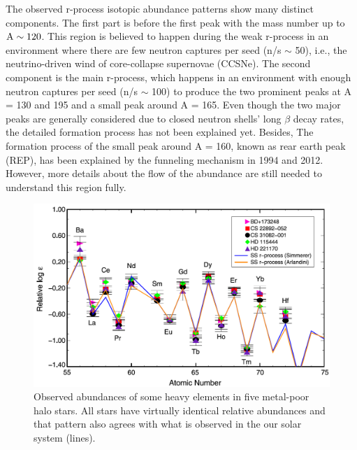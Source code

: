 \documentclass[aps,prl,preprint,groupedaddress]{revtex4}
\begin{document}
The observed r-process isotopic abundance patterns show many distinct components. The first part is before the first peak with the mass number up to $\rm{A \sim 120}$. This region is believed to happen during the weak r-process in an environment where there are few neutron captures per seed (n/s $\sim$ 50)\cite{1996}, i.e., the neutrino-driven wind of core-collapse supernovae (CCSNe)\cite{1994ApJ...433..229W}. The second component is the main r-process, which happens in an environment with enough neutron captures per seed (n/s $\sim$ 100) to produce the two prominent peaks at A = 130 and 195 and a small peak around A = 165. Even though the two major peaks are generally considered due to closed neutron shells' long $\beta$ decay rates, the detailed formation process has not been explained yet. Besides, The formation process of the small peak around A = 160, known as rear earth peak (REP), has been explained by the funneling mechanism in 1994\cite{1997astro.ph..1007S} and 2012\cite{PhysRevC.85.045801}. However, more details about the flow of the abundance are still needed to understand this region fully. 

\begin{figure}
\centering
\includegraphics[scale=0.23]{halo_samples}
\caption{
Observed abundances of some heavy elements in five metal-poor halo stars. All stars have virtually identical relative abundances and that pattern also agrees with what is observed in the
our solar system (lines).
}
\label{fig:halo_samples}
\end{figure}
\end{document}
